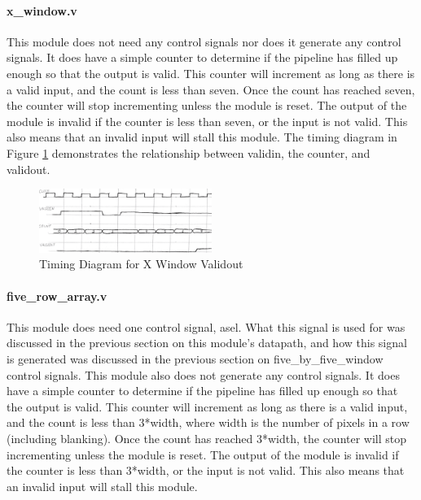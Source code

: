 \paragraph{x\_window.v}
This module does not need any control signals nor does it generate any control 
signals. It does have a simple counter to determine if the pipeline has filled 
up enough so that the output is valid. This counter will increment as long as 
there is a valid input, and the count is less than seven. Once the count has 
reached seven, the counter will stop incrementing unless the module is reset. 
The output of the module is invalid if the counter is less than seven, or the 
input is not valid. This also means that an invalid input will stall this 
module. The timing diagram in Figure \ref{fig:timing_1} demonstrates the 
relationship between validin, the counter, and validout.

\begin{figure}
    \includegraphics[width=0.5\textwidth]{processed_image_pngs/timing_1.png}
    \caption{Timing Diagram for X Window Validout}
    \label{fig:timing_1}
\end{figure}



\paragraph{five\_row\_array.v}
This module does need one control signal, asel. What this signal is used for was discussed in the previous section on this module's datapath, and how this signal is generated was discussed in the previous section on five\_by\_five\_window control signals. This module also does not generate any control signals. It does have a simple counter to determine if the pipeline has filled up enough so that the output is valid. This counter will increment as long as there is a valid input, and the count is less than 3*width, where width is the number of pixels in a row (including blanking). Once the count has reached 3*width, the counter will stop incrementing unless the module is reset. The output of the module is invalid if the counter is less than 3*width, or the input is not valid. This also means that an invalid input will stall this module.

